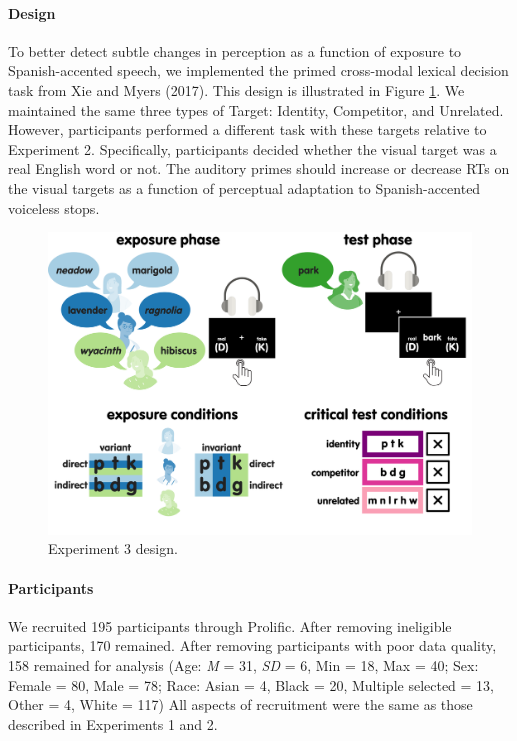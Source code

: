 \documentclass[
  12pt,
  twoside]{article}
\begin{document}
\hypertarget{design-1}{%
\paragraph{Design}\label{design-1}}

To better detect subtle changes in perception as a function of exposure to Spanish-accented speech, we implemented the primed cross-modal lexical decision task from Xie and Myers (2017).
This design is illustrated in Figure \ref{fig:exp3-fig}.
We maintained the same three types of Target: Identity, Competitor, and Unrelated.
However, participants performed a different task with these targets relative to Experiment 2.
Specifically, participants decided whether the visual target was a real English word or not.
The auditory primes should increase or decrease RTs on the visual targets as a function of perceptual adaptation to Spanish-accented voiceless stops.

\begin{figure}[H]

{\centering \includegraphics[width=\textwidth]{figures/diss_3} 

}

\caption{Experiment 3 design.}\label{fig:exp3-fig}
\end{figure}

\hypertarget{methods-pars-2}{%
\paragraph{Participants}\label{methods-pars-2}}

We recruited 195 participants through Prolific.
After removing ineligible participants, 170 remained.
After removing participants with poor data quality, 158 remained for analysis (Age: \emph{M} = 31, \emph{SD} = 6, Min = 18, Max = 40; Sex: Female = 80, Male = 78; Race: Asian = 4, Black = 20, Multiple selected = 13, Other = 4, White = 117)
All aspects of recruitment were the same as those described in Experiments 1 and 2.
\end{document}
